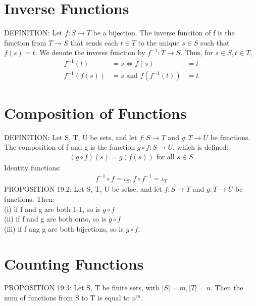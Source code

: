 \documentclass[12pt]{article}
\begin{document}
\section{Inverse Functions}
	DEFINITION: Let $ f: S \to T $ be a bijection. The inverse funciton of 
	f is the function from $ T \to S $ that sends each $ t \in T $ to the 
	unique $ s \in S $ such that $ f(s) = t $. We denote the
	inverse function by $ f^{-1}: T \to S $. Thus, for
	$ s \in S, t \in T $,
	\begin{align*}
		f^{-1}(t) &=  s \Leftrightarrow f(s) &=  t \\
		f^{-1}(f(s)) &=  s \text{ and } f(f^{-1}(t)) &= t
	\end{align*}
\section{Composition of Functions}
	DEFINITION: Let S, T, U be sets, and let $ f: S \to T $ and
	$ g: T \to U $ be functions. The composition of f and g is the function
	$ g \circ f: S \to U $, which is defined:
	\begin{align*}
		(g \circ f)(s) = g(f(s)) \text{ for all } s \in S
	\end{align*}
	Identity functions:
	\begin{align*}
		f^{-1} \circ f = \iota_S, f \circ f^{-1} = \iota_T
	\end{align*}
	PROPOSITION 19.2: Let S, T, U be setse, and let $ f: S \to T $ and
	$ g: T \to U $ be functions. Then: \\
	(i) if f and g are both 1-1, so is $ g \circ f $ \\
	(ii) if f and g are both onto, so is $ g \circ f $ \\
	(iii) if f ang g are both bijections, so is $ g \circ f $.
\section{Counting Functions}
	PROPOSITION 19.3: Let S, T be finite sets, with
	$ |S|=m, |T|=n $. Then the num of functions from S to T is equal to 
	$ n^m $.
	
\end{document}
